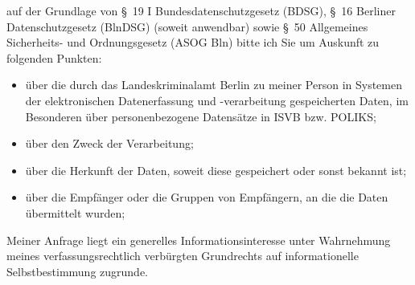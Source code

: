 auf der Grundlage von §~19 I Bundesdatenschutzgesetz (BDSG),
§~16 Berliner Datenschutzgesetz (BlnDSG) (soweit anwendbar) sowie
§~50 Allgemeines Sicherheits- und Ordnungsgesetz (ASOG Bln) bitte ich Sie um 
Auskunft zu folgenden Punkten:

\begin{itemize}
  \item über die durch das Landeskriminalamt Berlin zu meiner Person in Systemen
  der elektronischen Datenerfassung und -verarbeitung gespeicherten Daten, im Besonderen
  über personenbezogene Datensätze in ISVB bzw. POLIKS;

  \item über den Zweck der Verarbeitung;

  \item über die Herkunft der Daten, soweit diese gespeichert oder sonst bekannt ist;

  \item über die Empfänger oder die Gruppen von Empfängern, an die die Daten übermittelt wurden;
\end{itemize}

Meiner Anfrage liegt ein generelles Informationsinteresse unter Wahrnehmung
meines verfassungsrechtlich verbürgten Grundrechts auf informationelle
Selbstbestimmung zugrunde.
